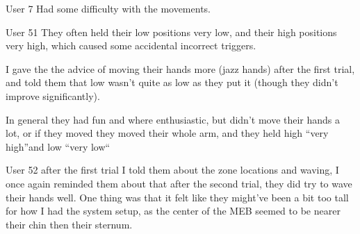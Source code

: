 User 7
Had some difficulty with the movements.


User 51
They often held their low positions very low, and their high positions very high, which caused some accidental incorrect triggers.

I gave the the advice of moving their hands more (jazz hands) after the first trial, and told them that low wasn’t quite as low as they put it (though they didn’t improve significantly).

In general they had fun and where enthusiastic, but didn’t move their hands a lot, or if they moved they moved their whole arm, and they held high “very high”and low “very low“

User 52
after the first trial I told them about the zone locations and waving, I once again reminded them about that after the second trial, they did try to wave their hands well.
One thing was that it felt like they might’ve been a bit too tall for how I had the system setup, as the center of the MEB seemed to be nearer their chin then their sternum.
